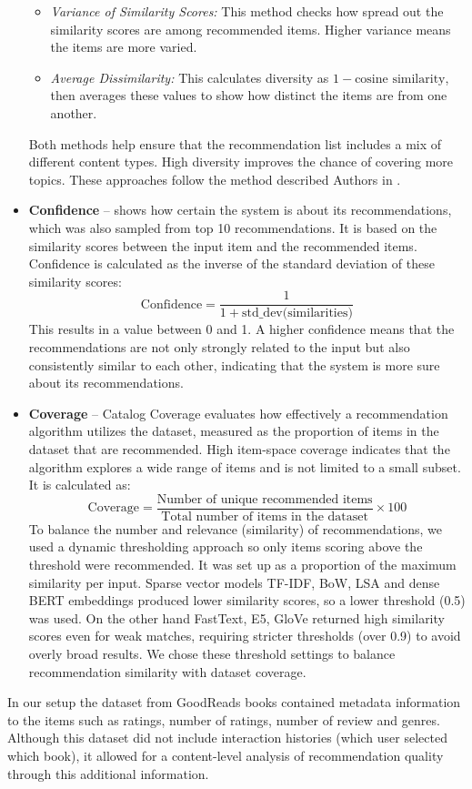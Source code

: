 \documentclass[\myFontSize,a4paper,oneside,hidelinks]{article}
\begin{document}
\begin{itemize}
\begin{itemize}
    \item \textit{Variance of Similarity Scores:} This method checks how spread out the similarity scores are among recommended items. Higher variance means the items are more varied.
    
    \item \textit{Average Dissimilarity:} This calculates diversity as \(1 - \text{cosine similarity}\), then averages these values to show how distinct the items are from one another.
\end{itemize}

Both methods help ensure that the recommendation list includes a mix of different content types. High diversity improves the chance of covering more topics. These approaches follow the method described Authors in \cite{Silveira2019813}.


	\item \textbf{Confidence} – shows how certain the system is about its recommendations, which was also sampled from top 10 recommendations. It is based on the similarity scores between the input item and the recommended items. Confidence is calculated as the inverse of the standard deviation of these similarity scores:
\[
\text{Confidence} = \frac{1}{1 + \text{std\_dev(similarities)}}
\]
This results in a value between 0 and 1. A higher confidence means that the recommendations are not only strongly related to the input but also consistently similar to each other, indicating that the system is more sure about its recommendations.


	\item \textbf{Coverage} – Catalog Coverage evaluates how effectively a recommendation algorithm utilizes the dataset, measured as the proportion of items in the dataset that are recommended. High item-space coverage indicates that the algorithm explores a wide range of items and is not limited to a small subset. It is calculated as:
\[
\text{Coverage} = \frac{\text{Number of unique recommended items}}{\text{Total number of items in the dataset}} \times 100
\]
To balance the number and relevance (similarity) of recommendations, we used a dynamic thresholding approach so only items scoring above the threshold were recommended. It was set up as a proportion of the maximum similarity per input. Sparse vector models TF-IDF, BoW, LSA and dense BERT embeddings produced lower similarity scores, so a lower threshold (0.5) was used. On the other hand FastText, E5, GloVe returned high similarity scores even for weak matches, requiring stricter thresholds (over 0.9) to avoid overly broad results. We chose these threshold settings to balance recommendation similarity with dataset coverage.

\end{itemize}
In our setup the dataset from GoodReads books contained metadata information to the items such as ratings, number of ratings, number of review and genres. Although this dataset did not include interaction histories (which user selected which book), it allowed for a content-level analysis of recommendation quality through this additional information.
\end{document}
